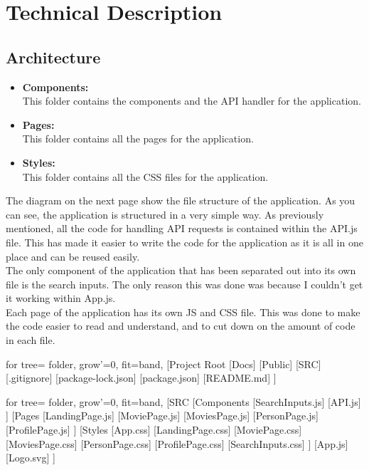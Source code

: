 \documentclass[12pt,a4paper]{article}
\begin{document}
	\section{Technical Description}
		\subsection{Architecture}
			\begin{itemize}
				\item \textbf{Components:}\\
					This folder contains the components and the API handler for the application.
				\item \textbf{Pages:}\\
					This folder contains all the pages for the application.
				\item \textbf{Styles:}\\
					This folder contains all the CSS files for the application.
		  	\end{itemize}
			The diagram on the next page show the file structure of the application. As you can see, the 
			application is structured in a very simple way. As previously mentioned, all the code for 
			handling API requests is contained within the API.js file. This has made it easier to write 
			the code for the application as it is all in one place and can be reused easily.\\
			
			The only component of the application that has been separated out into its own file is the 
			search inputs. The only reason this was done was because I couldn't get it working within 
			App.js.\\

			Each page of the application has its own JS and CSS file. This was done to make the code 
			easier to read and understand, and to cut down on the amount of code in each file.\\	
		
			\begin{minipage}[b]{0.5\textwidth}
				\begin{forest}
					for tree={
					  folder,
					  grow'=0,
					  fit=band,
					}
					[Project Root
						[Docs]
						[Public]
						[SRC]
						[.gitignore]
						[package-lock.json]
						[package.json]
						[README.md]
					]
				\end{forest}
			\end{minipage}
			\hfill
			\begin{minipage}[c]{0.5\textwidth} 
				\begin{forest}
				for tree={
				  folder,
				  grow'=0,
				  fit=band,
				}
				[SRC
				  [Components
					[SearchInputs.js]
					[API.js]
				  ]
				  [Pages
					[LandingPage.js]
					[MoviePage.js]
					[MoviesPage.js]
					[PersonPage.js]
					[ProfilePage.js]
				  ]
				  [Styles
					[App.css]
					[LandingPage.css]
					[MoviePage.css]
					[MoviesPage.css]
					[PersonPage.css]
					[ProfilePage.css]
					[SearchInputs.css]
				  ]
				  [App.js]
				  [Logo.svg]
				]
			  \end{forest}
			\end{minipage}
			\newpage
\end{document}
